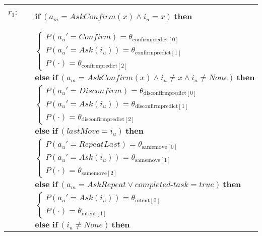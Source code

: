 \begin{footnotesize}
\begin{longtable}{p{2cm}l}
$r_{1}$: \ \ & $ \textbf{if} \ (\mathit{a_m}\!=\!\mathit{AskConfirm({x})} \land \mathit{i_u}\!=\!\mathit{{x}}) \ \textbf{then} $ \\
 & \;\;\;\;\; $ \begin{cases}P(\mathit{a_u}'\!=\!\mathit{Confirm})\!=\!\theta_{\mathrm{confirmpredict[0]}} \\
P(\mathit{a_u}'\!=\!\mathit{{Ask(i_u)}})\!=\!\theta_{\mathrm{confirmpredict[1]}} \\
P(\cdot)\!=\!\theta_{\mathrm{confirmpredict[2]}} \end{cases}$  \vspace{1mm} \\ & $ \textbf{else if} \ (\mathit{a_m}\!=\!\mathit{AskConfirm({x})} \land \mathit{i_u}\!\neq\!\mathit{{x}} \land \mathit{i_u}\!\neq\!\mathit{None}) \ \textbf{then}$ \\
& \;\;\;\;\; $ \begin{cases}P(\mathit{a_u}'\!=\!\mathit{Disconfirm})\!=\!\theta_{\mathrm{disconfirmpredict[0]}} \\
P(\mathit{a_u}'\!=\!\mathit{{Ask(i_u)}})\!=\!\theta_{\mathrm{disconfirmpredict[1]}} \\
P(\cdot)\!=\!\theta_{\mathrm{disconfirmpredict[2]}} \end{cases}$ \vspace{1mm} \\ & $ \textbf{else if} \ (\mathit{lastMove}\!=\!\mathit{{i_u}}) \ \textbf{then}$ \\
& \;\;\;\;\; $ \begin{cases}P(\mathit{a_u}'\!=\!\mathit{RepeatLast})\!=\!\theta_{\mathrm{samemove[0]}} \\
P(\mathit{a_u}'\!=\!\mathit{{Ask(i_u)}})\!=\!\theta_{\mathrm{samemove[1]}} \\
P(\cdot)\!=\!\theta_{\mathrm{samemove[2]}} \end{cases}$ \vspace{1mm} \\ & $ \textbf{else if} \ (\mathit{a_m}\!=\!\mathit{AskRepeat} \lor \mathit{completed\mbox{-}task}\!=\!\mathit{true}) \ \textbf{then}$ \\
& \;\;\;\;\; $ \begin{cases}P(\mathit{a_u}'\!=\!\mathit{{Ask(i_u)}})\!=\!\theta_{\mathrm{intent[0]}} \\
P(\cdot)\!=\!\theta_{\mathrm{intent[1]}} \end{cases}$  \vspace{1mm} \\ & $ \textbf{else if} \ (\mathit{i_u}\!\neq\!\mathit{None}) \ \textbf{then}$ \\

\end{longtable}
\end{footnotesize}
